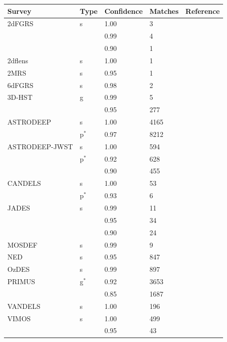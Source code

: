 \begin{table}[!p]
    \centering
    \begin{tabular}{lllll}
        \hline
        Survey & Type & Confidence & Matches& Reference \\
        \hline
        \hline
        2dFGRS & s & 1.00 & 3 & \citet{colless2001} \\
               &   & 0.99 & 4 & \\
               &   & 0.90 & 1 & \\
        2dflens & s & 1.00 & 1 & \citet{blake2016} \\
        2MRS & s & 0.95 & 1 & \citet{huchra2012} \\
        6dFGRS & s & 0.98 & 2 & \citet{jones2009} \\
        3D-HST & g & 0.99 & 5 & \citet{momcheva2016} \\
               &   & 0.95 & 277 & \\
        ASTRODEEP & s & 1.00 & 4165 & \citet{merlin2021} \\
                  & p$^{*}$ & 0.97 & 8212 & \\
        ASTRODEEP-JWST & s & 1.00 & 594 & \citet{merlin2024} \\
                       & p$^{*}$ & 0.92 & 628 & \\
                       &   & 0.90 & 455 & \\
        CANDELS & s & 1.00 & 53 & \citet{kodra2023} \\
                & p$^{*}$ & 0.93 & 6 & \\
        JADES & s & 0.99 & 11 & \citet{deugenio2025} \\
              &   & 0.95 & 34 & \\
              &   & 0.90 & 24 & \\
        MOSDEF & s & 0.99 & 9 & \citet{kriek2015} \\
        NED & s & 0.95 & 847 & \citet{helou1991} \\
        OzDES & s & 0.99 & 897 & \citet{lidman2020} \\
        PRIMUS & g$^{*}$ & 0.92 & 3653 & \citet{cool2013} \\
               &   & 0.85 & 1687 & \\
        VANDELS & s & 1.00 & 196 & \citet{garilli2021} \\
        VIMOS & s & 1.00 & 499 & \citet{balestra2010} \\
                  &   & 0.95 & 43 & \\

\end{tabular}
\end{table}
